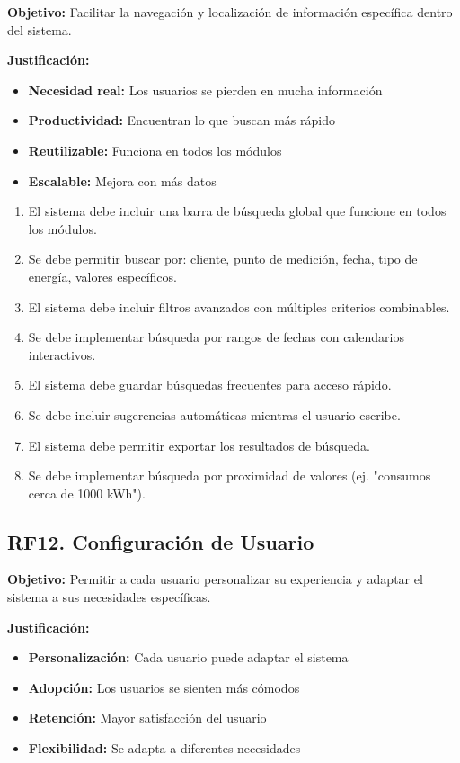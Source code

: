 \documentclass[12pt,a4paper]{article}
\begin{document}
\textbf{Objetivo:} Facilitar la navegación y localización de información específica dentro del sistema.

\textbf{Justificación:}
\begin{itemize}
    \item \textbf{Necesidad real:} Los usuarios se pierden en mucha información
    \item \textbf{Productividad:} Encuentran lo que buscan más rápido
    \item \textbf{Reutilizable:} Funciona en todos los módulos
    \item \textbf{Escalable:} Mejora con más datos
\end{itemize}

\begin{enumerate}[label=RF11.\arabic*]
    \item El sistema debe incluir una barra de búsqueda global que funcione en todos los módulos.
    \item Se debe permitir buscar por: cliente, punto de medición, fecha, tipo de energía, valores específicos.
    \item El sistema debe incluir filtros avanzados con múltiples criterios combinables.
    \item Se debe implementar búsqueda por rangos de fechas con calendarios interactivos.
    \item El sistema debe guardar búsquedas frecuentes para acceso rápido.
    \item Se debe incluir sugerencias automáticas mientras el usuario escribe.
    \item El sistema debe permitir exportar los resultados de búsqueda.
    \item Se debe implementar búsqueda por proximidad de valores (ej. "consumos cerca de 1000 kWh").
\end{enumerate}

\subsection{RF12. Configuración de Usuario}

\textbf{Objetivo:} Permitir a cada usuario personalizar su experiencia y adaptar el sistema a sus necesidades específicas.

\textbf{Justificación:}
\begin{itemize}
    \item \textbf{Personalización:} Cada usuario puede adaptar el sistema
    \item \textbf{Adopción:} Los usuarios se sienten más cómodos
    \item \textbf{Retención:} Mayor satisfacción del usuario
    \item \textbf{Flexibilidad:} Se adapta a diferentes necesidades
\end{itemize}
\end{document}
